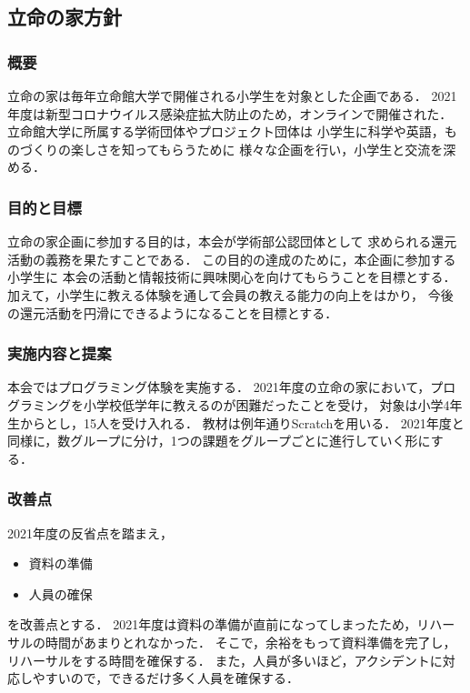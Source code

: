 \subsection*{立命の家方針}


\subsubsection*{概要}
立命の家は毎年立命館大学で開催される小学生を対象とした企画である．
2021年度は新型コロナウイルス感染症拡大防止のため，オンラインで開催された．
立命館大学に所属する学術団体やプロジェクト団体は
小学生に科学や英語，ものづくりの楽しさを知ってもらうために
様々な企画を行い，小学生と交流を深める．

\subsubsection*{目的と目標}
立命の家企画に参加する目的は，本会が学術部公認団体として
求められる還元活動の義務を果たすことである．
この目的の達成のために，本企画に参加する小学生に
本会の活動と情報技術に興味関心を向けてもらうことを目標とする．
加えて，小学生に教える体験を通して会員の教える能力の向上をはかり，
今後の還元活動を円滑にできるようになることを目標とする．

\subsubsection*{実施内容と提案}
本会ではプログラミング体験を実施する．
2021年度の立命の家において，プログラミングを小学校低学年に教えるのが困難だったことを受け，
対象は小学4年生からとし，15人を受け入れる．
教材は例年通りScratchを用いる．
2021年度と同様に，数グループに分け，1つの課題をグループごとに進行していく形にする．

\subsubsection*{改善点}
2021年度の反省点を踏まえ，
\begin{itemize}
  \item 資料の準備
  \item 人員の確保
\end{itemize}
を改善点とする．
2021年度は資料の準備が直前になってしまったため，リハーサルの時間があまりとれなかった．
そこで，余裕をもって資料準備を完了し，リハーサルをする時間を確保する．
また，人員が多いほど，アクシデントに対応しやすいので，できるだけ多く人員を確保する．

